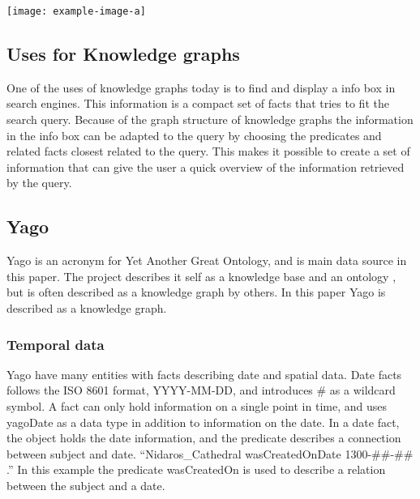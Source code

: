 
\texttt{[image: example-image-a]}\\
\subsection{Uses for Knowledge graphs}
One of the uses of knowledge graphs today is to find and display a info box in search engines. This information is a compact set of facts that tries to fit the search query. Because of the graph structure of knowledge graphs the information in the info box can be adapted to the query by choosing the predicates and related facts closest related to the query. This makes it possible to create a set of information that can give the user a quick overview of the information retrieved by the query.\\

\subsection{Yago}
Yago is an acronym for Yet Another Great Ontology, and is main data source in this paper. The project describes it self as a knowledge base\cite{yago} and an ontology \cite{mahdisoltani:hal-01699874}, but is often described as a knowledge graph by others. In this paper Yago is described as a knowledge graph.\\

\subsubsection{Temporal data}
Yago have many entities with facts describing date and spatial data.\cite{yago} Date facts follows the ISO 8601 format, YYYY-MM-DD, and introduces \# as a wildcard symbol. A fact can only hold information on a single point in time, and uses yagoDate as a data type in addition to information on the date.\cite{yago} In a date fact, the object holds the date information, and the predicate describes a connection between subject and date. ``Nidaros\_Cathedral wasCreatedOnDate 1300-\#\#-\#\# .'' In this example the predicate wasCreatedOn is used to describe a relation between the subject and a date.\\


